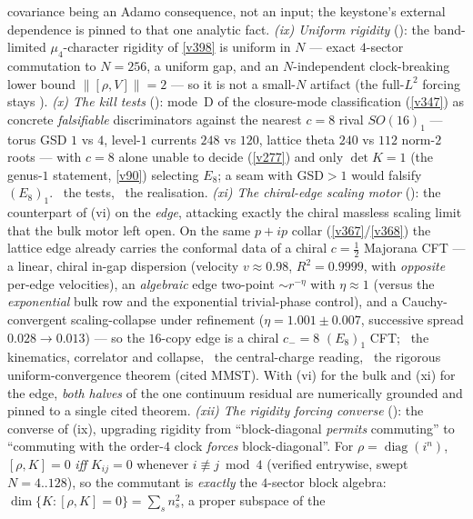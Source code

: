 \documentclass[11pt,a4paper]{article}
\begin{document}
\begin{keybox}
covariance being an Adamo consequence, not an input; the keystone's external dependence is pinned to that one
analytic fact. \emph{(ix) Uniform rigidity} (): the band-limited
$\mu_4$-character rigidity of \vref{v398} is uniform in $N$ --- exact $4$-sector commutation to $N{=}256$, a
uniform gap, and an $N$-independent clock-breaking lower bound $\|[\rho,V]\|{=}2$ --- so it is not a small-$N$
artifact (the full-$L^2$ forcing stays \mO). \emph{(x) The kill tests} ():
mode~D of the closure-mode classification (\vref{v347}) as concrete \emph{falsifiable} discriminators against the
nearest $c{=}8$ rival $SO(16)_1$ --- torus GSD $1$ vs $4$, level-$1$ currents $248$ vs $120$, lattice theta $240$
vs $112$ norm-$2$ roots --- with $c{=}8$ alone unable to decide (\vref{v277}) and only $\det K{=}1$ (the genus-$1$
statement, \vref{v90}) selecting $E_8$; a seam with GSD${>}1$ would falsify $(E_8)_1$. \mX\ the tests, \mO\ the
realisation. \emph{(xi) The chiral-edge scaling motor} (): the counterpart of
(vi) on the \emph{edge}, attacking exactly the chiral massless scaling limit that the bulk motor left open. On the
same $p{+}ip$ collar (\vref{v367}/\vref{v368}) the lattice edge already carries the conformal data of a chiral
$c{=}\tfrac12$ Majorana CFT --- a linear, chiral in-gap dispersion (velocity $v{\approx}0.98$, $R^2{=}0.9999$, with
\emph{opposite} per-edge velocities), an \emph{algebraic} edge two-point $\sim r^{-\eta}$ with $\eta{\approx}1$
(versus the \emph{exponential} bulk row and the exponential trivial-phase control), and a Cauchy-convergent
scaling-collapse under refinement ($\eta{=}1.001{\pm}0.007$, successive spread $0.028{\to}0.013$) --- so the
$16$-copy edge is a chiral $c_-{=}8$ $(E_8)_1$ CFT; \mE\ the kinematics, correlator and collapse, \mC\ the
central-charge reading, \mO\ the rigorous uniform-convergence theorem (cited MMST). With (vi) for the bulk and
(xi) for the edge, \emph{both halves} of the one continuum residual are numerically grounded and pinned to a single
cited theorem. \emph{(xii) The rigidity forcing converse} (): the converse
of (ix), upgrading rigidity from ``block-diagonal \emph{permits} commuting'' to ``commuting with the order-$4$
clock \emph{forces} block-diagonal''. For $\rho{=}\operatorname{diag}(i^n)$, $[\rho,K]{=}0$ \emph{iff}
$K_{ij}{=}0$ whenever $i{\not\equiv}j\bmod4$ (verified entrywise, swept $N{=}4..128$), so the commutant is
\emph{exactly} the $4$-sector block algebra: $\dim\{K:[\rho,K]{=}0\}{=}\sum_s n_s^2$, a proper subspace of the

\end{keybox}
\end{document}
